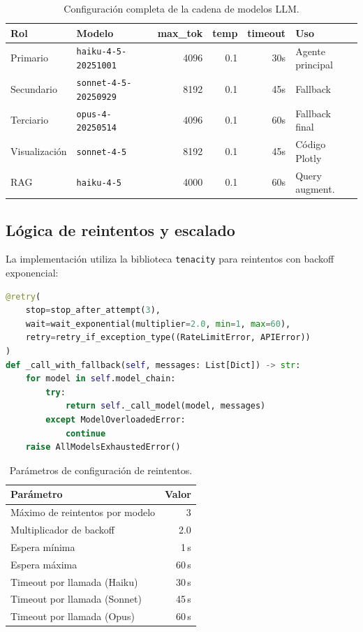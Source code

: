 \begin{table}[H]
\centering
\caption{Configuración completa de la cadena de modelos \acs{LLM}.}
\label{tab:appendix_models}
\footnotesize
\begin{tabularx}{\columnwidth}{llrrrX}
\toprule
\textbf{Rol} & \textbf{Modelo} & \textbf{max\_tok} & \textbf{temp} & \textbf{timeout} & \textbf{Uso} \\
\midrule
Primario & \texttt{haiku-4-5-20251001} & 4096 & 0.1 & 30s & Agente principal \\
Secundario & \texttt{sonnet-4-5-20250929} & 8192 & 0.1 & 45s & Fallback \\
Terciario & \texttt{opus-4-20250514} & 4096 & 0.1 & 60s & Fallback final \\
Visualización & \texttt{sonnet-4-5} & 8192 & 0.1 & 45s & Código Plotly \\
\ac{RAG} & \texttt{haiku-4-5} & 4000 & 0.1 & 60s & Query augment. \\
\bottomrule
\end{tabularx}
\end{table}

\subsection{Lógica de reintentos y escalado}

La implementación utiliza la biblioteca \texttt{tenacity} para reintentos con backoff exponencial:

\begin{lstlisting}[language=Python, basicstyle=\tiny\ttfamily, backgroundcolor=\color{codebg}]
@retry(
    stop=stop_after_attempt(3),
    wait=wait_exponential(multiplier=2.0, min=1, max=60),
    retry=retry_if_exception_type((RateLimitError, APIError))
)
def _call_with_fallback(self, messages: List[Dict]) -> str:
    for model in self.model_chain:
        try:
            return self._call_model(model, messages)
        except ModelOverloadedError:
            continue
    raise AllModelsExhaustedError()
\end{lstlisting}

\begin{table}[H]
\centering
\caption{Parámetros de configuración de reintentos.}
\label{tab:appendix_reintentos}
\footnotesize
\begin{tabularx}{\columnwidth}{Xr}
\toprule
\textbf{Parámetro} & \textbf{Valor} \\
\midrule
Máximo de reintentos por modelo & 3 \\
Multiplicador de backoff & 2.0 \\
Espera mínima & 1\,s \\
Espera máxima & 60\,s \\
Timeout por llamada (Haiku) & 30\,s \\
Timeout por llamada (Sonnet) & 45\,s \\
Timeout por llamada (Opus) & 60\,s \\
\bottomrule
\end{tabularx}
\end{table}

